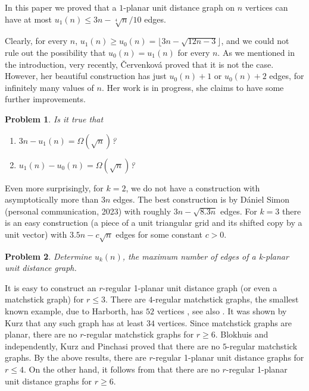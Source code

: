 \documentclass[a4paper,10pt]{article}
\newtheorem{problem}{Problem}
\begin{document}
In this paper we proved that a $1$-planar unit distance graph on $n$ vertices can have at most $u_1(n)\le 3n-\sqrt[4]{n}/10$ edges. 

Clearly, for every $n$, $u_1(n)\ge u_0(n)=\lfloor 3n - \sqrt{12n - 3}\rfloor$, and 
we could not rule out the possibility that
$u_0(n)= u_1(n)$ for every $n$. 
As we mentioned in the introduction, very recently,  \v{C}ervenkov\'a \cite{C25}
proved that it is not the case. However, her beautiful construction 
has just $u_0(n)+1$ or $u_0(n)+2$ edges, for 
infinitely many values of $n$. Her work is in progress, she claims to have some further improvements. 

\begin{problem}
Is it true that
    \begin{enumerate}[label=(\roman*)]
        \item $3n-u_1(n)=\Omega(\sqrt{n})$?

\item $u_1(n)-u_0(n)=\Omega(\sqrt{n})$?
\end{enumerate}

\end{problem}

Even more surprisingly, for $k=2$, we do not have a construction with asymptotically more than $3n$ edges. 
The best construction is by  D\'aniel Simon (personal communication, 2023) with roughly $3n-\sqrt{8.3n}$ edges. For $k=3$ there is an easy construction (a piece of a unit triangular grid and its shifted copy by a unit vector) with $3.5n - c\sqrt{n}$ edges for some constant $c>0$.


\begin{problem}
 Determine $u_k(n)$, the maximum number of edges of a k-planar unit distance graph. 
\end{problem}

It is easy to construct an $r$-regular 1-planar unit distance graph (or even a matchstick graph) for $r \leq 3$. There are $4$-regular matchstick graphs, the smallest known example, due to  Harborth, has $52$ vertices \cite{Harborth2}, see also \cite{WD17}. It was shown by Kurz \cite{K11} that any such graph has at least $34$ vertices. Since matchstick graphs are planar, there are no $r$-regular matchstick graphs for $r\ge 6$. Blokhuis \cite{B14} and independently, Kurz and Pinchasi \cite{KP11} proved that there are no $5$-regular matchstick graphs. By the above results, there are  $r$-regular 1-planar unit distance graphs for $r\leq 4$. On the other hand, it follows from  that there are no $r$-regular 1-planar unit distance graphs for $r\ge 6$.
\end{document}
